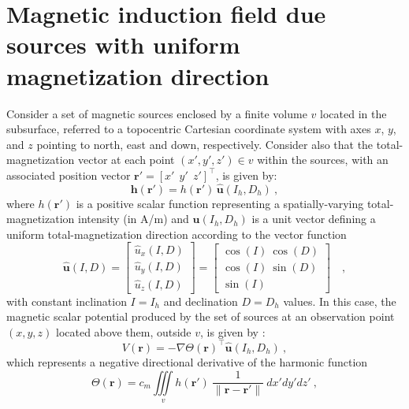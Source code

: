 \section{Magnetic induction field due sources with uniform magnetization direction}
\label{sec:induction_uniform_direction}


Consider a set of magnetic sources enclosed by a finite volume $v$ located 
in the subsurface, referred to a topocentric Cartesian coordinate system with axes 
$x$, $y$, and $z$ pointing to north, east and down, respectively. 
Consider also that the total-magnetization vector at each point $(x', y', z') \in v$ 
within the sources, with an associated position vector 
$\mathbf{r}' = \left[x' \:\: y' \:\: z' \right]^{\top}$, is given by:
\begin{equation}
\mathbf{h}(\mathbf{r}') = h(\mathbf{r}') \, \hat{\mathbf{u}}(I_{h}, D_{h}) \: ,
\label{eq:total-magnetization-vector}
\end{equation}
where $h(\mathbf{r}')$ is a positive scalar function representing a spatially-varying 
total-magnetization intensity (in A/m) and $\hat{\mathbf{u}}(I_{h}, D_{h})$ 
is a unit vector defining a uniform total-magnetization direction according to
the vector function
\begin{equation}
\hat{\mathbf{u}}(I, D) =
\begin{bmatrix}
\hat{u}_{x}(I, D) \\
\hat{u}_{y}(I, D) \\
\hat{u}_{z}(I, D)
\end{bmatrix} =
\begin{bmatrix}
\cos(I) \: \cos(D) \\ 
\cos(I) \: \sin(D) \\
\sin(I)
\end{bmatrix} \quad ,
\label{eq:u-unit-vector}
\end{equation}
with constant inclination $I = I_{h}$ and declination $D = D_{h}$ values.
In this case, the magnetic scalar potential produced by the set of sources at an
observation point $(x,y,z)$ located above them, outside $v$, is given by
\cite[e.g., ][ p. 196]{jackson1999}:
\begin{equation}
V(\mathbf{r}) 
= -\nabla \Theta(\mathbf{r})^{\top} 
\hat{\mathbf{u}}(I_{h}, D_{h}) \: ,
\label{eq:scalar-potential-V}
\end{equation}
which represents a negative directional derivative of the harmonic function
\begin{equation}
\Theta(\mathbf{r}) = c_{m} \iiint\limits_{v}
h(\mathbf{r}') \: \frac{1}{\| \mathbf{r} - \mathbf{r}'\|}
\: dx'dy'dz' \: ,
\label{eq:scalar-potential-Theta}
\end{equation}
